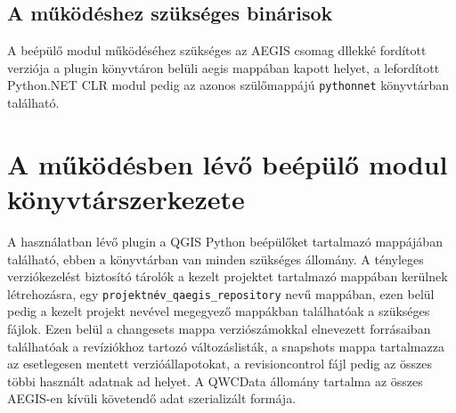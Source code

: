 \subsection{A működéshez szükséges binárisok}
A beépülő modul működéséhez szükséges az AEGIS csomag dllekké fordított verziója a plugin könyvtáron belüli aegis mappában kapott helyet, a lefordított Python.NET CLR modul pedig az azonos szülőmappájú \texttt{pythonnet} könyvtárban található.

\section{A működésben lévő beépülő modul könyvtárszerkezete}
A használatban lévő plugin a QGIS Python beépülőket tartalmazó mappájában található, ebben a könyvtárban van minden szükséges állomány. A tényleges verziókezelést biztosító tárolók a kezelt projektet tartalmazó mappában kerülnek létrehozásra, egy \texttt{projektnév\_qaegis\_repository} nevű mappában, ezen belül pedig a kezelt projekt nevével megegyező mappákban találhatóak a szükséges fájlok. Ezen belül a changesets mappa verziószámokkal elnevezett forrásaiban találhatóak a revíziókhoz tartozó változáslisták, a snapshots mappa tartalmazza az esetlegesen mentett verzióállapotokat, a revisioncontrol fájl pedig az összes többi használt adatnak ad helyet. A QWCData állomány tartalma az összes AEGIS-en kívüli követendő adat szerializált formája.

